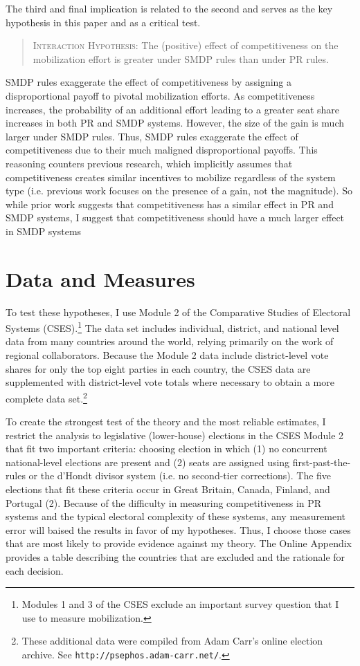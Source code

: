 \documentclass[12pt]{article}
\begin{document}
The third and final implication is related to the second and serves as the key hypothesis in this paper and as a critical test. 

\begin{quote}
\textsc{Interaction Hypothesis}: The (positive) effect of  competitiveness on the mobilization effort is greater under SMDP rules than under PR rules.
\end{quote}

\noindent SMDP rules exaggerate the effect of competitiveness by assigning a disproportional payoff to pivotal mobilization efforts. As competitiveness increases, the probability of an additional effort leading to a greater seat share increases in both PR and SMDP systems. However, the size of the gain is much larger under SMDP rules. Thus, SMDP rules exaggerate the effect of competitiveness due to their much maligned disproportional payoffs. This reasoning counters previous research, which implicitly assumes that competitiveness creates similar incentives to mobilize regardless of the system type (i.e. previous work focuses on the presence of a gain, not the magnitude). So while prior work suggests that competitiveness has a similar
effect in PR and SMDP systems, I suggest that competitiveness should have a much larger effect in SMDP systems

\section*{Data and Measures}

To test these hypotheses, I use Module 2 of the Comparative Studies of Electoral Systems (CSES).\footnote{Modules 1 and 3 of the CSES exclude an important survey question that I use to measure mobilization.} The data set includes individual, district, and national level data from many countries around the world, relying primarily on the work of regional collaborators. Because the Module 2 data include district-level vote shares for only the top eight parties in each country, the CSES data are supplemented with district-level vote totals where necessary to obtain a more complete data set.\footnote{These additional data were compiled from Adam Carr's online election archive. See \texttt{http://psephos.adam-carr.net/}.}

To create the strongest test of the theory and the most reliable estimates, I restrict the analysis to legislative (lower-house) elections in the CSES Module 2 that fit two important criteria: choosing election in which (1) no concurrent national-level elections are present and (2) seats are assigned using first-past-the-rules or the d'Hondt divisor system (i.e. no second-tier corrections). The five elections that fit these criteria occur in Great Britain, Canada, Finland, and Portugal (2). Because of the difficulty in measuring competitiveness in PR systems and the typical electoral complexity of these systems, any measurement error will baised the results in favor of my hypotheses. Thus, I choose those cases that are most likely to provide evidence against my theory. The Online Appendix provides a table describing the countries that are excluded and the rationale for each decision.
\end{document}
